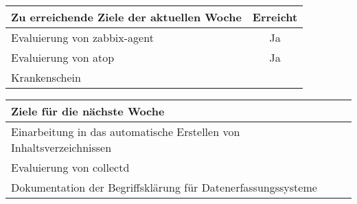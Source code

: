 \begin{tabularx}{\textwidth}{Xc}
    \arrayrulecolor{OliveGreen}
    \toprule
    {\bfseries Zu erreichende Ziele der aktuellen Woche} & {\bfseries Erreicht} \\
    \midrule[2pt]
    Evaluierung von zabbix-agent                         &Ja                    \\
    \rowcolor{OliveGreen!15}
    Evaluierung von atop                                 &Ja                    \\
    \rowcolor{White}
    Krankenschein                                        &                      \\
    \bottomrule[2pt]
\end{tabularx}
%
\vspace{1cm}
%
\begin{tabularx}{\textwidth}{Xc}
    \arrayrulecolor{OliveGreen}
    \toprule
    {\bfseries Ziele für die nächste Woche}              &                      \\
    \midrule[2pt]
    Einarbeitung in das automatische Erstellen von Inhaltsverzeichnissen &      \\
    \rowcolor{OliveGreen!15}
    Evaluierung von collectd                             &                      \\
    \rowcolor{White}
    Dokumentation der Begriffsklärung für Datenerfassungssysteme &              \\
\end{tabularx}
